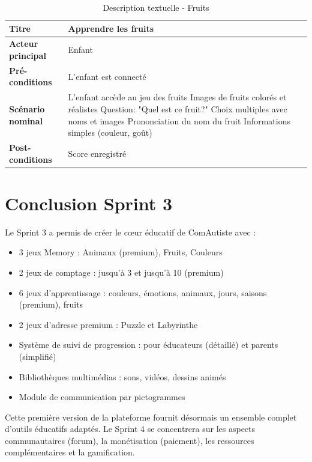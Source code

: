 \documentclass[12pt,a4paper]{report}
\begin{document}
\begin{table}[H]
\centering
\begin{tabular}{|p{4cm}|p{10cm}|}
\hline
\textbf{Titre} & Apprendre les fruits \\
\hline
\textbf{Acteur principal} & Enfant \\
\hline
\textbf{Pré-conditions} & L'enfant est connecté \\
\hline
\textbf{Scénario nominal} & 
L'enfant accède au jeu des fruits \newline
Images de fruits colorés et réalistes \newline
Question: "Quel est ce fruit?" \newline
Choix multiples avec noms et images \newline
Prononciation du nom du fruit \newline
Informations simples (couleur, goût) \\
\hline
\textbf{Post-conditions} & Score enregistré \\
\hline
\end{tabular}
\caption{Description textuelle - Fruits}
\end{table}
\section*{Conclusion Sprint 3}

Le Sprint 3 a permis de créer le cœur éducatif de ComAutiste avec :

\begin{itemize}
\item 3 jeux Memory : Animaux (premium), Fruits, Couleurs
\item 2 jeux de comptage : jusqu'à 3 et jusqu'à 10 (premium)
\item 6 jeux d'apprentissage : couleurs, émotions, animaux, jours, saisons (premium), fruits
\item 2 jeux d'adresse premium : Puzzle et Labyrinthe
\item Système de suivi de progression : pour éducateurs (détaillé) et parents (simplifié)
\item Bibliothèques multimédias : sons, vidéos, dessins animés
\item Module de communication par pictogrammes
\end{itemize}

Cette première version de la plateforme fournit désormais un ensemble complet d’outils éducatifs adaptés.  
Le Sprint 4 se concentrera sur les aspects communautaires (forum), la monétisation (paiement), les ressources complémentaires et la gamification.
\end{document}

